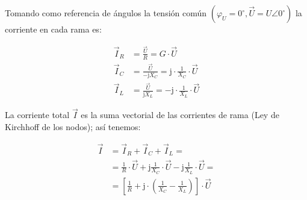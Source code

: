 \documentclass[
  a4paper,
  DIV=11,
  numbers=noendperiod]{scrreprt}
\begin{document}
Tomando como referencia de ángulos la tensión común
\((\varphi_U=0^\circ, \vec{U}=U\angle 0^\circ)\) la corriente en cada
rama es:

\[
\begin{aligned}
\vec{I}_R &= \frac{\vec{U}}{R} = G \cdot \vec{U} \\
\vec{I}_C &= \frac{\vec{U}}{-\mathrm{j}X_C} = \mathrm{j} \cdot \frac{1}{X_C} \cdot \vec{U} \\
\vec{I}_L &= \frac{\vec{U}}{\mathrm{j}X_L} = -\mathrm{j} \cdot \frac{1}{X_L} \cdot \vec{U}
\end{aligned}
\]

La corriente total \(\vec{I}\) es la suma vectorial de las corrientes de
rama (Ley de Kirchhoff de los nodos); así tenemos:

\[
\begin{aligned}
\vec{I} &= \vec{I}_R + \vec{I}_C + \vec{I}_L= \\
&= \frac{1}{R} \cdot \vec{U} + \mathrm{j} \frac{1}{X_C} \cdot \vec{U} - \mathrm{j} \frac{1}{X_L} \cdot \vec{U}= \\
&= \left[ \frac{1}{R} + \mathrm{j} \cdot \left(\frac{1}{X_C} - \frac{1}{X_L}\right) \right] \cdot \vec{U}
\end{aligned}
\]
\end{document}
